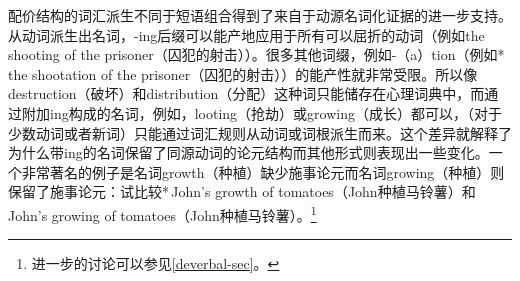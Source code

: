     配价结构的词汇派生不同于短语组合得到了来自于动源名词化证据的进一步支持\citep{Wechsler2008a}。从动词派生出名词，-ing后缀可以能产地应用于所有可以屈折的动词（例如the shooting of the prisoner（囚犯的射击））。很多其他词缀，例如-（a）tion（例如*\,the shootation of the prisoner（囚犯的射击））的能产性就非常受限。所以像destruction（破坏）和distribution（分配）这种词只能储存在心理词典中，而通过附加ing构成的名词，例如，looting（抢劫）或growing（成长）都可以，（对于少数动词或者新词）只能通过词汇规则从动词或词根派生而来\citep{Zucchi93a-u}。这个差异就解释了为什么带ing的名词保留了同源动词的论元结构而其他形式则表现出一些变化。一个非常著名的例子是名词growth（种植）缺少施事论元而名词growing（种植）则保留了施事论元：试比较*\,John's growth of tomatoes（John种植马铃薯）和John's growing of tomatoes（John种植马铃薯）\citep{Chomsky70a}。\footnote{进一步的讨论可以参见\ref{deverbal-sec}。} 

